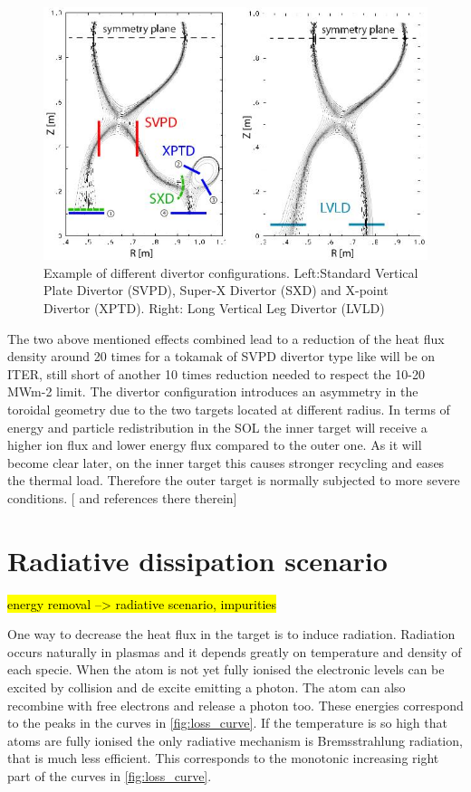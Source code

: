 \begin{figure}
	\centering
	\includegraphics[width=\linewidth]{Chapters/chapter1/figs/divertor geometry.jpg}
	\caption{Example of different divertor configurations. Left:Standard Vertical Plate Divertor (SVPD), Super-X Divertor (SXD) and X-point Divertor (XPTD). Right: Long Vertical Leg Divertor (LVLD) \cite{Umansky2017}}
	\label{fig:divertor_geometry}
\end{figure}

The two above mentioned effects combined lead to a reduction of the heat flux density around 20 times for a tokamak of SVPD divertor type like will be on ITER, still short of another 10 times reduction needed to respect the 10-20 MWm-2 limit. The divertor configuration introduces an asymmetry in the toroidal geometry due to the two targets located at different radius. In terms of energy and particle redistribution in the SOL the inner target will receive a higher ion flux and lower energy flux compared to the outer one. As it will become clear later, on the inner target this causes stronger recycling and eases the thermal load. Therefore the outer target is normally subjected to more severe conditions. [\cite{Potzel2014} and references there therein]

\section{Radiative dissipation scenario}
\hl{energy removal --> radiative scenario, impurities}

One way to decrease the heat flux in the target is to induce radiation.
Radiation occurs naturally in plasmas and it depends greatly on temperature and density of each specie. When the atom is not yet fully ionised the electronic levels can be excited by collision and de excite emitting a photon. The atom can also recombine with free electrons and release a photon too. These energies correspond to the peaks in the curves in \autoref{fig:loss_curve}. If the temperature is so high that atoms are fully ionised the only radiative mechanism is Bremsstrahlung radiation, that is much less efficient. This corresponds to the monotonic increasing right part of the curves in \autoref{fig:loss_curve}.

